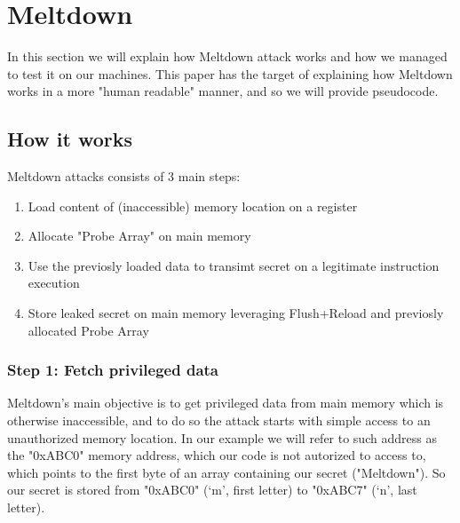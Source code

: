 \section{Meltdown}
In this section we will explain how Meltdown attack works and how we managed to
test it on our machines. This paper has the target of explaining how Meltdown works in a more "human readable" manner, and so we will provide pseudocode.

\subsection{How it works}
Meltdown attacks consists of 3 main steps:

\begin{enumerate}[label={Step \arabic*:}]
    \item Load content of (inaccessible) memory location on a register
    \item Allocate "Probe Array" on main memory
    \item Use the previosly loaded data to transimt secret on a legitimate instruction execution
    \item Store leaked secret on main memory leveraging Flush+Reload and previosly allocated Probe Array
\end{enumerate}


\subsubsection{Step 1: Fetch privileged data}
Meltdown's main objective is to get privileged data from main memory which is otherwise inaccessible, and to do so
the attack starts with simple access to an unauthorized memory location.
In our example we will refer to such address as the "0xABC0" memory address, which our code is not autorized to access to,
which points to the first byte of an array containing our secret ("Meltdown").
So our secret is stored from "0xABC0" (`m', first letter) to "0xABC7" (`n', last letter).

